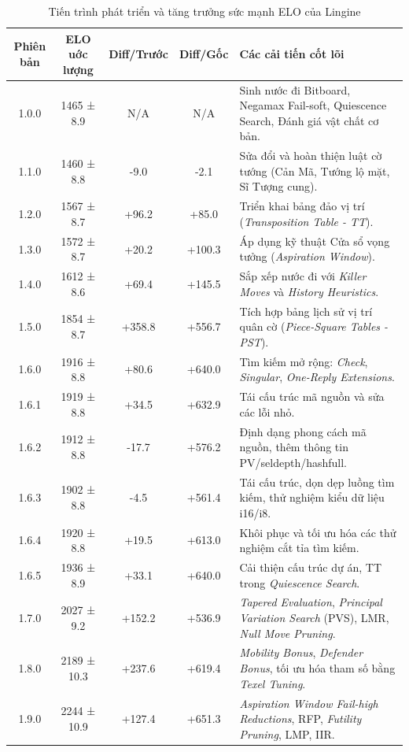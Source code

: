 \begin{table}[H]
    \centering
    \small
    \setlength{\tabcolsep}{6pt}
    \begin{tabular}{ccccp{5.5cm}}
        \toprule
        Phiên bản & ELO uớc lượng & Diff/Trước & Diff/Gốc & Các cải tiến cốt lõi \\
        \midrule
        1.0.0  & 1465 ± 8.9 & N/A & N/A & Sinh nước đi Bitboard, Negamax Fail-soft, Quiescence Search, Đánh giá vật chất cơ bản. \\
        1.1.0  & 1460 ± 8.8 & -9.0 & -2.1 & Sửa đổi và hoàn thiện luật cờ tướng (Cản Mã, Tướng lộ mặt, Sĩ Tượng cung). \\
        1.2.0  & 1567 ± 8.7 & +96.2 & +85.0 & Triển khai bảng đảo vị trí (\textit{Transposition Table - TT}). \\
        1.3.0  & 1572 ± 8.7 & +20.2 & +100.3 & Áp dụng kỹ thuật Cửa sổ vọng tưởng (\textit{Aspiration Window}). \\
        1.4.0  & 1612 ± 8.6 & +69.4 & +145.5 & Sắp xếp nước đi với \textit{Killer Moves} và \textit{History Heuristics}. \\
        1.5.0  & 1854 ± 8.7 & +358.8 & +556.7 & Tích hợp bảng lịch sử vị trí quân cờ (\textit{Piece-Square Tables - PST}). \\
        1.6.0  & 1916 ± 8.8 & +80.6 & +640.0 & Tìm kiếm mở rộng: \textit{Check}, \textit{Singular}, \textit{One-Reply Extensions}. \\
        1.6.1  & 1919 ± 8.8 & +34.5 & +632.9 & Tái cấu trúc mã nguồn và sửa các lỗi nhỏ. \\
        1.6.2  & 1912 ± 8.8 & -17.7 & +576.2 & Định dạng phong cách mã nguồn, thêm thông tin PV/seldepth/hashfull. \\
        1.6.3  & 1902 ± 8.8 & -4.5 & +561.4 & Tái cấu trúc, dọn dẹp luồng tìm kiếm, thử nghiệm kiểu dữ liệu i16/i8. \\
        1.6.4  & 1920 ± 8.8 & +19.5 & +613.0 & Khôi phục và tối ưu hóa các thử nghiệm cắt tỉa tìm kiếm. \\
        1.6.5  & 1936 ± 8.9 & +33.1 & +640.0 & Cải thiện cấu trúc dự án, TT trong \textit{Quiescence Search}. \\
        1.7.0  & 2027 ± 9.2 & +152.2 & +536.9 & \textit{Tapered Evaluation}, \textit{Principal Variation Search} (PVS), LMR, \textit{Null Move Pruning}. \\
        1.8.0  & 2189 ± 10.3 & +237.6 & +619.4 & \textit{Mobility Bonus}, \textit{Defender Bonus}, tối ưu hóa tham số bằng \textit{Texel Tuning}. \\
        1.9.0  & 2244 ± 10.9 & +127.4 & +651.3 & \textit{Aspiration Window Fail-high Reductions}, RFP, \textit{Futility Pruning}, LMP, IIR. \\
        \bottomrule
    \end{tabular}
    \caption{Tiến trình phát triển và tăng trưởng sức mạnh ELO của Lingine}
    \label{tab:elo_progression}
\end{table}

